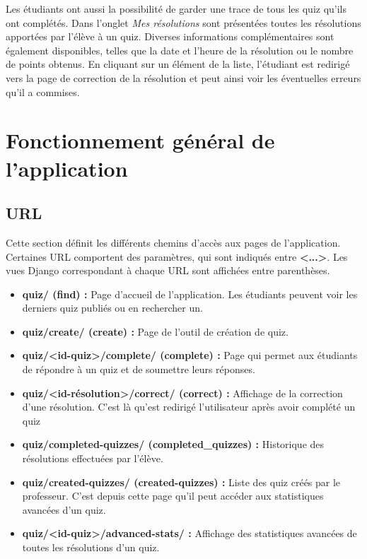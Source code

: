 \documentclass[a4paper,11pt,openany,oneside]{sphinxmanual}
\begin{document}
Les étudiants ont aussi la possibilité de garder une trace de tous les quiz qu'ils ont complétés. Dans l'onglet \emph{Mes résolutions} sont présentées toutes les résolutions apportées par l'élève à un quiz. Diverses informations complémentaires sont également disponibles, telles que la date et l'heure de la résolution ou le nombre de points obtenus. En cliquant sur un élément de la liste, l'étudiant est redirigé vers la page de correction de la résolution et peut ainsi voir les éventuelles erreurs qu'il a commises.


\chapter{Fonctionnement général de l'application}
\label{global:fonctionnement-general-de-l-application}\label{global::doc}

\section{URL}
\label{global:url}
Cette section définit les différents chemins d'accès aux pages de l'application. Certaines URL comportent des paramètres,
qui sont indiqués entre \textbf{\textless{}...\textgreater{}}. Les vues Django correspondant à chaque URL sont affichées entre parenthèses.
\begin{itemize}
\item {} 
\textbf{quiz/ (find) :} Page d'accueil de l'application. Les étudiants peuvent voir les derniers quiz publiés ou en rechercher un.

\item {} 
\textbf{quiz/create/ (create) :} Page de l'outil de création de quiz.

\item {} 
\textbf{quiz/\textless{}id-quiz\textgreater{}/complete/ (complete) :} Page qui permet aux étudiants de répondre à un quiz et de soumettre leurs réponses.

\item {} 
\textbf{quiz/\textless{}id-résolution\textgreater{}/correct/ (correct) :} Affichage de la correction d'une résolution. C'est là qu'est redirigé l'utilisateur après avoir complété un quiz

\item {} 
\textbf{quiz/completed-quizzes/ (completed\_quizzes) :} Historique des résolutions effectuées par l'élève.

\item {} 
\textbf{quiz/created-quizzes/ (created-quizzes) :} Liste des quiz créés par le professeur. C'est depuis cette page qu'il peut accéder aux statistiques avancées d'un quiz.

\item {} 
\textbf{quiz/\textless{}id-quiz\textgreater{}/advanced-stats/ :} Affichage des statistiques avancées de toutes les résolutions d'un quiz.

\end{itemize}
\end{document}
